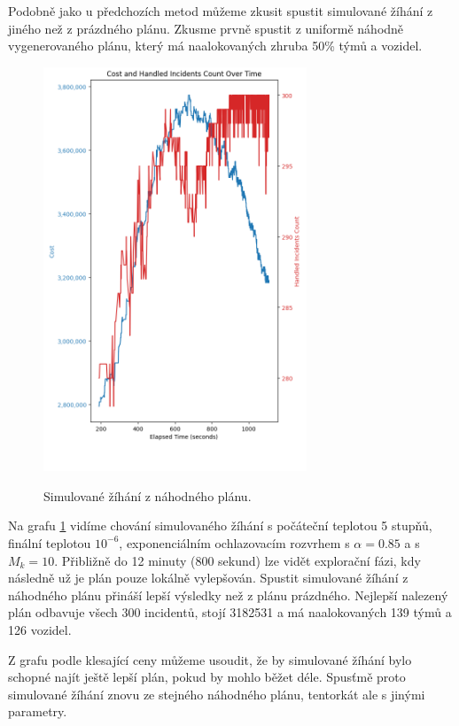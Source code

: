 Podobně jako u předchozích metod můžeme zkusit spustit simulované žíhání z jiného než z prázdného plánu.
Zkusme prvně spustit z uniformě náhodně vygenerovaného plánu, který má naalokovaných zhruba 50\% týmů a vozidel.

\begin{figure}[H]
  \caption{Simulované žíhání z náhodného plánu.}
  \includegraphics[width=0.7\textwidth,height=0.9\textwidth]{img/plots/sa_random_85.png}
  \centering
  \label{img:sa_random}
\end{figure}

Na grafu \ref{img:sa_random} vidíme chování simulovaného žíhání
s počáteční teplotou 5 stupňů, finální teplotou $10^{-6}$, exponenciálním ochlazovacím rozvrhem s $\alpha = 0.85$ a s $M_k = 10$.
Přibližně do 12 minuty (800 sekund) lze vidět explorační fázi, kdy následně už je plán pouze lokálně vylepšován. 
Spustit simulované žíhání z náhodného plánu přináší lepší výsledky než z plánu prázdného.
Nejlepší nalezený plán odbavuje všech 300 incidentů, stojí 3182531 a má naalokovaných 139 týmů a 126 vozidel.

Z grafu podle klesající ceny můžeme usoudit, že by simulované žíhání bylo schopné najít ještě lepší plán, pokud by mohlo běžet déle.
Spusťmě proto simulované žíhání znovu ze stejného náhodného plánu, tentorkát ale s jinými parametry.

